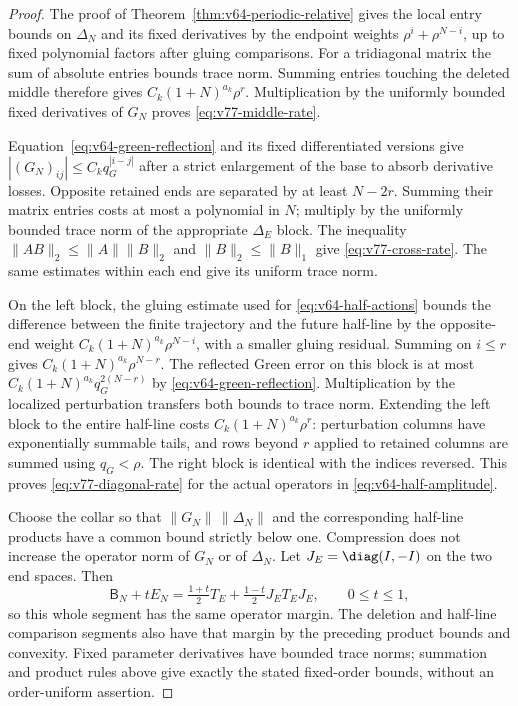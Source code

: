 \begin{proof}
The proof of Theorem~\ref{thm:v64-periodic-relative} gives the local
entry bounds on $\Delta_N$ and its fixed derivatives by the endpoint
weights $\rho^i+\rho^{N-i}$, up to fixed polynomial factors after
gluing comparisons.  For a tridiagonal matrix the sum of absolute
entries bounds trace norm.  Summing entries touching the deleted middle
therefore gives $C_k(1+N)^{a_k}\rho^r$.  Multiplication by the
uniformly bounded fixed derivatives of $G_N$ proves
\eqref{eq:v77-middle-rate}.

Equation~\eqref{eq:v64-green-reflection} and its fixed differentiated
versions give $|(G_N)_{ij}|\le C_kq_G^{|i-j|}$ after a strict
enlargement of the base to absorb derivative losses.  Opposite retained
ends are separated by at least $N-2r$.  Summing their matrix entries
costs at most a polynomial in $N$; multiply by the uniformly bounded
trace norm of the appropriate $\Delta_E$ block.  The inequality
$\|AB\|_2\le\|A\|\|B\|_2$ and $\|B\|_2\le\|B\|_1$
give \eqref{eq:v77-cross-rate}.  The same estimates within each end
give its uniform trace norm.

On the left block, the gluing estimate used for
\eqref{eq:v64-half-actions} bounds the difference between the finite
trajectory and the future half-line by the opposite-end weight
$C_k(1+N)^{a_k}\rho^{N-i}$, with a smaller gluing residual.
Summing on $i\le r$ gives $C_k(1+N)^{a_k}\rho^{N-r}$.
The reflected Green error on this block is at most
$C_k(1+N)^{a_k}q_G^{2(N-r)}$ by
\eqref{eq:v64-green-reflection}.  Multiplication by the localized
perturbation transfers both bounds to trace norm.  Extending the left
block to the entire half-line costs $C_k(1+N)^{a_k}\rho^r$:
perturbation columns have exponentially summable tails, and rows beyond
$r$ applied to retained columns are summed using $q_G<\rho$.
The right block is identical with the indices reversed.  This proves
\eqref{eq:v77-diagonal-rate} for the actual operators in
\eqref{eq:v64-half-amplitude}.

Choose the collar so that $\|G_N\|\,\|\Delta_N\|$ and the
corresponding half-line products have a common bound strictly below one.
Compression does not increase the operator norm of $G_N$ or of
$\Delta_N$.  Let $J_E=\diag(I,-I)$ on the two end spaces.  Then
\[
 \mathsf B_N+tE_N
 =\tfrac{1+t}{2}T_E+\tfrac{1-t}{2}J_ET_EJ_E,
 \qquad 0\le t\le1,
\]
so this whole segment has the same operator margin.  The deletion and
half-line comparison segments also have that margin by the preceding
product bounds and convexity.  Fixed parameter derivatives have bounded
trace norms; summation and product rules above give exactly the stated
fixed-order bounds, without an order-uniform assertion.


\end{proof}
